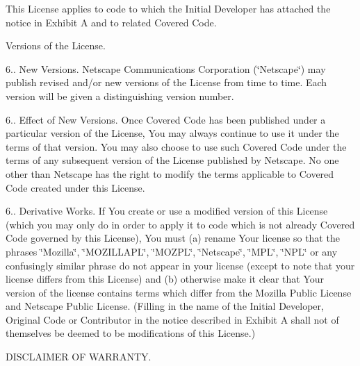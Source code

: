 \begin{DoxyEnumerate}
This License applies to code to which the Initial Developer has attached the notice in Exhibit A and to related Covered Code.
\item Versions of the License.

6.. New Versions. Netscape Communications Corporation (\char`\"{}\+Netscape\char`\"{}) may publish revised and/or new versions of the License from time to time. Each version will be given a distinguishing version number.

6.. Effect of New Versions. Once Covered Code has been published under a particular version of the License, You may always continue to use it under the terms of that version. You may also choose to use such Covered Code under the terms of any subsequent version of the License published by Netscape. No one other than Netscape has the right to modify the terms applicable to Covered Code created under this License.

6.. Derivative Works. If You create or use a modified version of this License (which you may only do in order to apply it to code which is not already Covered Code governed by this License), You must (a) rename Your license so that the phrases \char`\"{}\+Mozilla\char`\"{}, \char`\"{}\+M\+O\+Z\+I\+L\+L\+A\+P\+L\char`\"{}, \char`\"{}\+M\+O\+Z\+P\+L\char`\"{}, \char`\"{}\+Netscape\char`\"{}, \char`\"{}\+M\+P\+L\char`\"{}, \char`\"{}\+N\+P\+L\char`\"{} or any confusingly similar phrase do not appear in your license (except to note that your license differs from this License) and (b) otherwise make it clear that Your version of the license contains terms which differ from the Mozilla Public License and Netscape Public License. (Filling in the name of the Initial Developer, Original Code or Contributor in the notice described in Exhibit A shall not of themselves be deemed to be modifications of this License.)
\item D\+I\+S\+C\+L\+A\+I\+M\+E\+R O\+F W\+A\+R\+R\+A\+N\+T\+Y.


\end{DoxyEnumerate}
